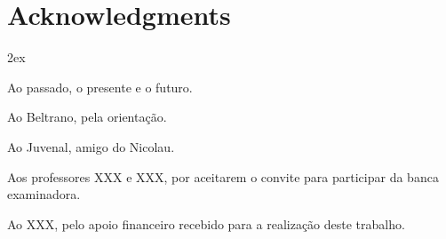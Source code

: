 \chapter*{Acknowledgments} 

\begin{trivlist} \itemsep 2ex \normalsize
\item Ao passado, o presente e o futuro.
\item Ao Beltrano, pela orientação.
\item Ao Juvenal, amigo do Nicolau.
\item Aos professores XXX e XXX, por aceitarem o convite para participar da banca examinadora.
\item Ao XXX, pelo apoio financeiro recebido para a realização deste trabalho.
\end{trivlist}


